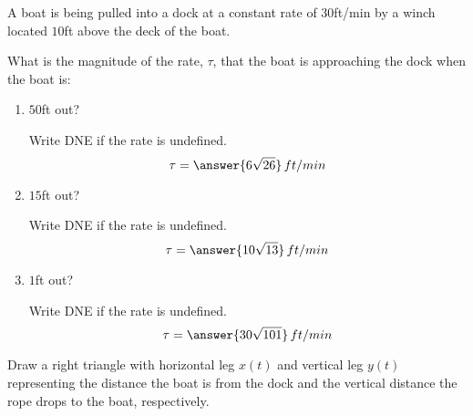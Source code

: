 \documentclass{ximera}
\author{Gregory Hartman \and Matthew Carr}
\begin{document}
\begin{exercise}



A boat is being pulled into a dock at a constant rate of $30$ft/min by
a winch located $10$ft above the deck of the boat.

What is the magnitude of the rate, $\tau$, that the boat is
approaching the dock when the boat is:
\begin{enumerate}
\item $50$ft out? \begin{prompt}Write DNE if the rate is undefined. \[\tau=\answer{6\sqrt{26}}\,ft/min\]\end{prompt}
\item $15$ft out? \begin{prompt}Write DNE if the rate is undefined.\[\tau=\answer{10\sqrt{13}}\,ft/min\]\end{prompt}
\item $1$ft out? \begin{prompt}Write DNE if the rate is undefined. \[\tau=\answer{30\sqrt{101}}\,ft/min\]\end{prompt}
\end{enumerate}

\begin{hint}
Draw a right triangle with horizontal leg $x(t)$ and vertical leg $y(t)$ representing the distance the boat is from the dock and the vertical distance the rope drops to the boat, respectively.
\end{hint}

\end{exercise}
\end{document}
